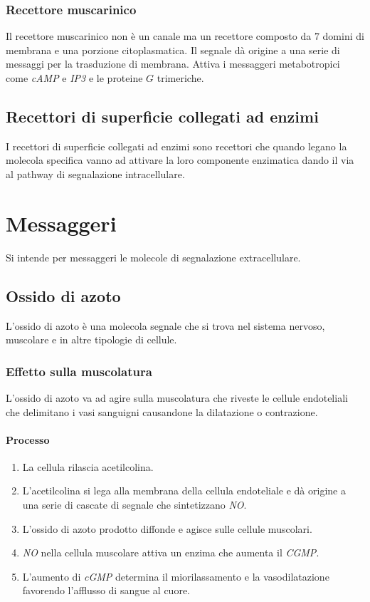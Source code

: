		\subsubsection{Recettore muscarinico}
		Il recettore muscarinico non \`e un canale ma un recettore composto da $7$ domini di membrana e una porzione citoplasmatica.
		Il segnale d\`a origine a una serie di messaggi per la trasduzione di membrana.
		Attiva i messaggeri metabotropici come \emph{cAMP} e \emph{IP3} e le proteine $G$ trimeriche.

	\subsection{Recettori di superficie collegati ad enzimi}
	I recettori di superficie collegati ad enzimi sono recettori che quando legano la molecola specifica vanno ad attivare la loro componente enzimatica dando il via al pathway di segnalazione intracellulare.

\section{Messaggeri}
Si intende per messaggeri le molecole di segnalazione extracellulare. 

	\subsection{Ossido di azoto}
	L'ossido di azoto \`e una molecola segnale che si trova nel sistema nervoso, muscolare e in altre tipologie di cellule.

		\subsubsection{Effetto sulla muscolatura}
		L'ossido di azoto va ad agire sulla muscolatura che riveste le cellule endoteliali che delimitano i vasi sanguigni causandone la dilatazione o contrazione.

			\paragraph{Processo}
			\begin{multicols}{2}
				\begin{enumerate}
					\item La cellula rilascia acetilcolina.
					\item L'acetilcolina si lega alla membrana della cellula endoteliale e d\`a origine a una serie di cascate di segnale che sintetizzano \emph{NO}.
					\item L'ossido di azoto prodotto diffonde e agisce sulle cellule muscolari.
					\item \emph{NO} nella cellula muscolare attiva un enzima che aumenta il \emph{CGMP}.
					\item L'aumento di \emph{cGMP} determina il miorilassamento e la vasodilatazione favorendo l'afflusso di sangue al cuore.
				\end{enumerate}
			\end{multicols}

